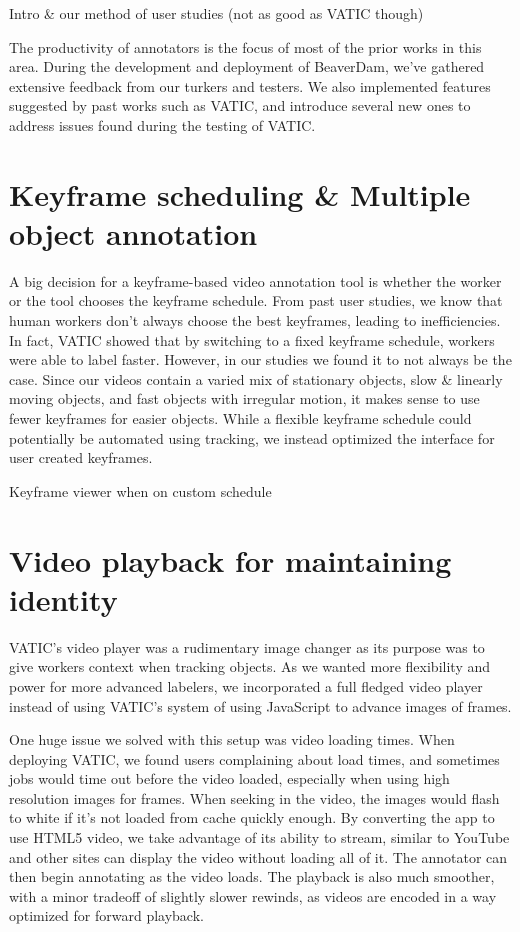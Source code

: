 
Intro \& our method of user studies (not as good as VATIC though)

The productivity of annotators is the focus of most of the prior works in this area.
During the development and deployment of BeaverDam, we've gathered extensive feedback from our turkers and testers.
We also implemented features suggested by past works such as VATIC,
and introduce several new ones to address issues found during the testing of VATIC.

\section{Keyframe scheduling \& Multiple object annotation}

A big decision for a keyframe-based video annotation tool is whether the worker or the tool chooses the keyframe schedule. 
From past user studies, we know that human workers don't always choose the best keyframes, leading to inefficiencies. 
In fact, VATIC showed that by switching to a fixed keyframe schedule, workers were able to label faster.
However, in our studies we found it to not always be the case. 
Since our videos contain a varied mix of stationary objects, slow \& linearly moving objects, and fast objects with irregular motion, it makes sense to use fewer keyframes for easier objects. 
While a flexible keyframe schedule could potentially be automated using tracking, we instead optimized the interface for user created keyframes.


Keyframe viewer when on custom schedule

\section{Video playback for maintaining identity}

VATIC's video player was a rudimentary image changer as its purpose was to give workers context when tracking objects.
As we wanted more flexibility and power for more advanced labelers, we incorporated a full fledged video player instead of using VATIC's system of using JavaScript to advance images of frames.

One huge issue we solved with this setup was video loading times.
When deploying VATIC, we found users complaining about load times, and sometimes jobs would time out before the video loaded, especially when using high resolution images for frames.
When seeking in the video, the images would flash to white if it's not loaded from cache quickly enough.
By converting the app to use HTML5 video, we take advantage of its ability to stream, similar to YouTube and other sites can display the video without loading all of it.
The annotator can then begin annotating as the video loads.
The playback is also much smoother, with a minor tradeoff of slightly slower rewinds, as videos are encoded in a way optimized for forward playback.

